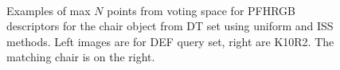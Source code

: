 \documentclass[11pt,a4paper]{kth-mag}
\begin{document}
\begin{figure}
  \centering
  \\
  \caption{Examples of max $N$ points from voting space for PFHRGB descriptors
    for the chair object from DT set using uniform and ISS methods. Left images
    are for DEF query set, right are K10R2. The matching chair is on the right.}
  \label{fig:chairvote}
\end{figure}
\end{document}
